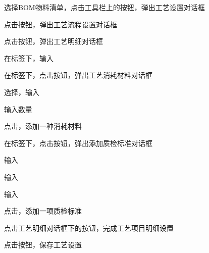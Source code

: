 {{        \item  选择BOM物料清单，点击工具栏上的按钮，弹出工艺设置对话框
        \item  点击按钮，弹出工艺流程设置对话框
        \item  点击按钮，弹出工艺明细对话框
        \item  在标签下，输入
        \item  在标签下，点击按钮，弹出工艺消耗材料对话框
        \item  选择，输入\item  输入{数量}
        \item  点击，添加一种消耗材料
        \item  在标签下，点击按钮，弹出添加质检标准对话框
        \item  输入
        \item  输入
        \item  输入
        \item  点击，添加一项质检标准
        \item  点击工艺明细对话框下的按钮，完成工艺项目明细设置
        \item  点击按钮，保存工艺设置
        }
    }

